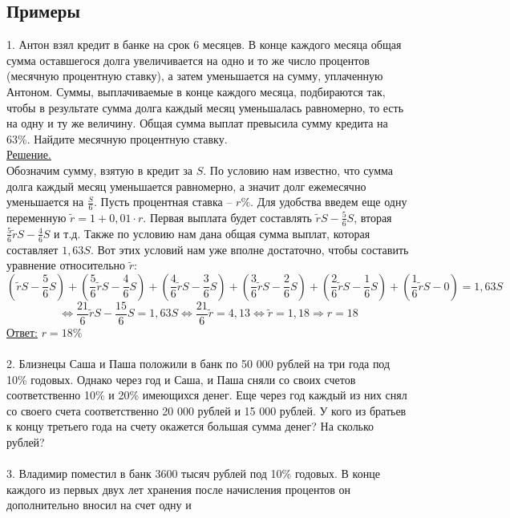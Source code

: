 \documentclass{article}
\begin{document}
\subsection{Примеры}
1. Антон взял кредит в банке на срок 6 месяцев. В конце каждого месяца общая сумма 
оставшегося долга увеличивается на одно и то же число процентов (месячную процентную ставку), а затем уменьшается на сумму, 
уплаченную Антоном. Суммы, выплачиваемые в конце каждого месяца, подбираются так, чтобы в результате сумма долга каждый месяц уменьшалась равномерно, то есть на одну и ту же величину. Общая сумма выплат превысила сумму кредита на 63\%. Найдите месячную процентную ставку.
\\
\underline{Решение.}
\\
Обозначим сумму, взятую в кредит за $S$. По условию нам известно, что сумма долга каждый
месяц уменьшается равномерно, а значит долг ежемесячно уменьшается на \( \frac{S}{6} \). 
Пусть процентная ставка -- $r$\%. Для удобства введем еще одну переменную 
\( \widetilde{r} = 1 + 0,01 \cdot r\). Первая выплата будет составлять 
\( \widetilde{r}S - \frac{5}{6} S\), вторая \( \frac{5}{6} \widetilde{r} S - \frac{4}{6} S\) 
и т.д.
Также по условию нам дана общая сумма выплат, которая составляет
\( 1,63S\).
Вот этих условий нам уже вполне достаточно, чтобы составить уравнение относительно \( \widetilde{r}\):
\[ \left( \widetilde{r}S - \frac{5}{6} S\right)  + 
\left( \frac{5}{6}\widetilde{r}S - \frac{4}{6} S\right) +
\left( \frac{4}{6}\widetilde{r}S - \frac{3}{6} S\right) +
\left( \frac{3}{6}\widetilde{r}S - \frac{2}{6} S\right) +
\left( \frac{2}{6}\widetilde{r}S - \frac{1}{6} S\right) +
\left( \frac{1}{6}\widetilde{r}S - 0\right) = 1,63S \]
\[ \Leftrightarrow \frac{21}{6}\widetilde{r}S - \frac{15}{6}S = 1,63S
\Leftrightarrow \frac{21}{6} \widetilde{r} = 4,13 
\Leftrightarrow \widetilde{r} = 1,18 \Rightarrow r = 18 \]
\underline{Ответ:} \( r = 18\%\)
\\
\\
2. Близнецы Саша и Паша положили в банк по 50 000 рублей на три года под 10\% годовых.
Однако через год и Саша, и Паша сняли со своих счетов соответственно 10\% и 20\% имеющихся денег. 
Еще через год каждый из них снял со своего счета соответственно 20 000 рублей и 15 000 рублей. 
У кого из братьев к концу третьего года на счету окажется большая сумма денег? На сколько рублей?
\\
\\
3. Владимир поместил в банк 3600 тысяч рублей под 10\% 
годовых. В конце каждого из первых двух лет хранения после 
начисления процентов он дополнительно вносил на счет одну и 
\end{document}
